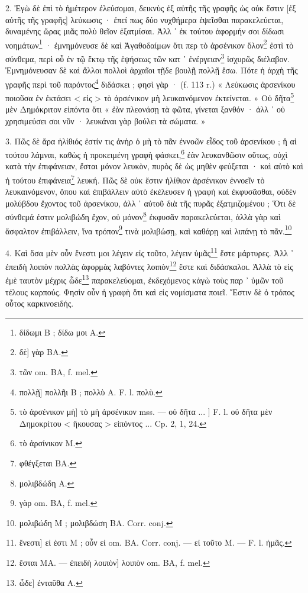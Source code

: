 \documentclass[a4paper, 11pt, oneside, polutonikogreek, french]{article}
\begin{document}
2. Ἐγὼ δὲ ἐπὶ τὸ ἡμέτερον ἐλεύσομαι, δεικνὺς ἐξ αὐτῆς τῆς γραφῆς ὡς οὐκ ἔστιν [ἐξ αὐτῆς τῆς γραφῆς] λεύκωσις · ἐπεί πως δύο νυχθήμερα ἑψεῖσθαι παρακελεύεται, δυναμένης ὥρας μιᾶς πολὺ θεῖον ἐξατμίσαι. Ἀλλ ᾽ ἐκ τούτου ἀφορμήν σοι δίδωσι νοημάτων\footnote{δίδωμι B ; δίδω μοι A.} · ἐμνημόνευσε δὲ καὶ Ἀγαθοδαίμων ὅτι περ τὸ ἀρσένικον ὅλον\footnote{δὲ] γὰρ BA.} ἐστὶ τὸ σύνθεμα, περὶ οὗ ἐν τῷ ἕκτῳ τῆς ἑψήσεως τῶν κατ ᾽ ἐνέργειαν\footnote{τῶν om. BA, f. mel.} ἰσχυρῶς διέλαβον. Ἐμνημόνευσαν δὲ καὶ ἄλλοι πολλοὶ ἀρχαῖοι τῇδε βουλῇ πολλῇ ἔσω. Πότε ἡ ἀρχὴ τῆς γραφῆς περὶ τοῦ παρόντος\footnote{πολλῇ] πολλῆι B ; πολλὺ A. F. l. πολὺ.} διδάσκει ; φησὶ γὰρ · (f. 113 r.) « Λεύκωσις ἀρσενίκου ποιοῦσα ἐν ἐκτάσει < εἰς > τὸ ἀρσένικον μὴ λευκαινόμενον ἐκτείνεται. » Οὐ δῆτα\footnote{τὸ ἀρσένικον μὴ] τὸ μὴ ἀρσένικον mss. --- οὐ δῆτα ... ] F. l. οὐ δῆτα μὲν Δημοκρίτου < ἤκουσας > εἰπόντος ... Cp. 2, 1, 24.} μὲν Δημόκριτον εἰπόντα ὅτι « ἐὰν πλεονάσῃ τὰ φῶτα, γίνεται ξανθόν · ἀλλ ᾽ οὐ χρησιμεύσει σοι νῦν · λευκάναι γὰρ βούλει τὰ σώματα. »

3. Πῶς δὲ ἄρα ἡλίθιός ἐστίν τις ἀνὴρ ὁ μὴ τὸ πᾶν ἐννοῶν εἶδος τοῦ ἀρσενίκου ; ἢ αἱ τούτου λάμναι, καθὼς ἡ προκειμένη γραφὴ φάσκει,\footnote{τὸ ἀρσίνικον M.} ἐὰν λευκανθῶσιν οὕτως, οὐχὶ κατὰ τὴν ἐπιφάνειαν, ἔσται μόνον λευκὸν, πυρὸς δὲ ὡς μηθὲν φεύξεται · καὶ αὐτὸ καὶ ἡ τούτου ἐπιφάνεια\footnote{φθέγξεται BA.} λευκή. Πῶς δὲ οὐκ ἔστιν ἠλίθιον ἀρσένικον ἐννοεῖν τὸ λευκαινόμενον, ὅπου καὶ ἐπιβάλλειν αὐτὸ ἐκέλευσεν ἡ γραφὴ καὶ ἐκφυσᾶσθαι, οὐδὲν μολύβδου ἔχοντος τοῦ ἀρσενίκου, ἀλλ ᾽ αὐτοῦ διὰ τῆς πυρᾶς ἐξατμιζομένου ; Ὅτι δὲ σύνθεμά ἐστιν μολιβώδη ἔχον, οὐ μόνον\footnote{μολιβδώδη A.} ἐκφυσᾶν παρακελεύεται, ἀλλὰ γὰρ καὶ ἄσφαλτον ἐπιβάλλειν, ἵνα τρόπον\footnote{γὰρ om. BA, f. mel.} τινὰ μολιβώσῃ, καὶ καθάρῃ καὶ λιπάνῃ τὸ πᾶν.\footnote{μολιβώδη M ; μολιβδώση BA. Corr. conj.}

4. Καὶ ὅσα μὲν οὖν ἔνεστι μοι λέγειν εἰς τοῦτο, λέγειν ὑμᾶς\footnote{ἕνεστι] εἰ ἐστι M ; οὗν εἰ om. BA. Corr. conj. --- εἰ τοῦτο M. --- F. l. ἡμᾶς.} ἔστε μάρτυρες. Ἀλλ ᾽ ἐπειδὴ λοιπὸν πολλὰς ἀφορμὰς λαβόντες λοιπὸν\footnote{ἔσται MA. --- ἐπειδὴ λοιπὸν] λοιπὸν om. BA, f. mel.} ἔστε καὶ διδάσκαλοι. Ἀλλὰ τὸ εἰς ἐμὲ ταυτὸν μέχρις ὧδε\footnote{ὧδε] ἐνταῦθα A.} παρακελεύομαι, ἐκδεχόμενος κἀγὼ τοὺς παρ ᾽ ὑμῶν τοῦ τέλους καρπούς. Φησὶν οὖν ἡ γραφὴ ὅτι καὶ εἰς νομίσματα ποιεῖ. Ἔστιν δὲ ὁ τρόπος οὗτος καρκινοειδής.
\end{document}
